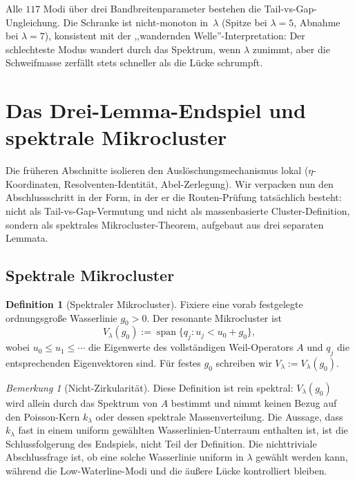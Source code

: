 \documentclass[12pt,a4paper]{article}
\theoremstyle{definition}
\newtheorem{definition}[theorem]{Definition}
\theoremstyle{remark}
\newtheorem{remark}[theorem]{Bemerkung}
\begin{document}
Alle $117$ Modi über drei Bandbreitenparameter bestehen die
Tail-vs-Gap-Ungleichung.
Die Schranke ist nicht-monoton in~$\lambda$ (Spitze bei $\lambda = 5$,
Abnahme bei $\lambda = 7$), konsistent mit der ,,wandernden Welle''-Interpretation:
Der schlechteste Modus wandert durch das Spektrum,
wenn $\lambda$ zunimmt, aber die Schweifmasse zerfällt stets schneller
als die Lücke schrumpft.

\section{Das Drei-Lemma-Endspiel und spektrale Mikrocluster}
\label{sec:endgame}

Die früheren Abschnitte isolieren den Auslöschungsmechanismus lokal
($\eta$-Koordinaten, Resolventen-Identität, Abel-Zerlegung). Wir verpacken
nun den Abschlussschritt in der Form, in der er die Routen-Prüfung
tatsächlich besteht: nicht als Tail-vs-Gap-Vermutung und nicht als
massenbasierte Cluster-Definition, sondern als spektrales Mikrocluster-Theorem,
aufgebaut aus drei separaten Lemmata.

\subsection{Spektrale Mikrocluster}

\begin{definition}[Spektraler Mikrocluster]
\label{def:geff}
Fixiere eine vorab festgelegte ordnungsgroße Wasserlinie $g_0 > 0$. Der
resonante Mikrocluster ist
\[
  V_\lambda(g_0) := \operatorname{span}\{q_j : u_j < u_0 + g_0\},
\]
wobei $u_0 \le u_1 \le \cdots$ die Eigenwerte des vollständigen Weil-Operators
$A$ und $q_j$ die entsprechenden Eigenvektoren sind. Für festes $g_0$
schreiben wir $V_\lambda:=V_\lambda(g_0)$.
\end{definition}

\begin{remark}[Nicht-Zirkularität]
Diese Definition ist rein spektral: $V_\lambda(g_0)$ wird allein durch das
Spektrum von $A$ bestimmt und nimmt keinen Bezug auf den Poisson-Kern
$k_\lambda$ oder dessen spektrale Massenverteilung. Die Aussage, dass
$k_\lambda$ fast in einem uniform gewählten Wasserlinien-Unterraum
enthalten ist, ist die Schlussfolgerung des Endspiels, nicht Teil der
Definition. Die nichttriviale Abschlussfrage ist, ob eine solche
Wasserlinie uniform in $\lambda$ gewählt werden kann, während die
Low-Waterline-Modi und die äußere Lücke kontrolliert bleiben.
\end{remark}
\end{document}

